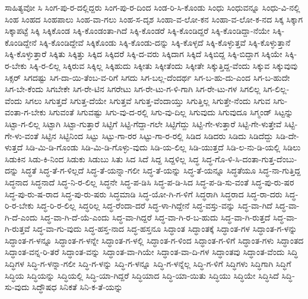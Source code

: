 {ಸಾಹಿತ್ಯವೋ
ಸಿ
ಸಿಂಗ-ಪು-ರ-ದಲ್ಲಿದ್ದರು
ಸಿಂಗ-ಪು-ರ-ದಿಂದ
ಸಿಂಡ-ರಿ-ಸಿ-ಕೊಂಡು
ಸಿಂಧು
ಸಿಂಧುವನ್ನೂ
ಸಿಂಧು-ವಿ-ನಲ್ಲಿ
ಸಿಂಹ
ಸಿಂಹದ
ಸಿಂಹಪಾಲು
ಸಿಂಹ-ವಾ-ಗಲು
ಸಿಂಹ-ಸ-ದೃಶ
ಸಿಂಹಾ-ವ-ಲೋ-ಕನ
ಸಿಂಹಾ-ವ-ಲೋ-ಕ-ನದ
ಸಿಕ್ಕ
ಸಿಕ್ಕಾಗ
ಸಿಕ್ಕಾಪಟ್ಟೆ
ಸಿಕ್ಕಿ
ಸಿಕ್ಕಿಕೊಂಡ
ಸಿಕ್ಕಿ-ಕೊಂಡಂತಾ-ಗಿದೆ
ಸಿಕ್ಕಿ-ಕೊಂಡರೆ
ಸಿಕ್ಕಿ-ಕೊಂಡಿದ್ದರೆ
ಸಿಕ್ಕಿ-ಕೊಂಡಿದ್ದಾ-ನೆಯೇ
ಸಿಕ್ಕಿ-ಕೊಂಡಿದ್ದೇನೆ
ಸಿಕ್ಕಿ-ಕೊಂಡಿದ್ದೇವೆ
ಸಿಕ್ಕಿಕೊಂಡು
ಸಿಕ್ಕಿ-ಕೊಂಡು-ದನ್ನು
ಸಿಕ್ಕಿ-ಕೊಳ್ಳದೆ
ಸಿಕ್ಕಿ-ಕೊಳ್ಳುತ್ತವೆ
ಸಿಕ್ಕಿ-ಕೊಳ್ಳುತ್ತಾನೆ
ಸಿಕ್ಕಿ-ಕೊಳ್ಳುತ್ತಾರೆ
ಸಿಕ್ಕಿತು
ಸಿಕ್ಕಿತ್ತು
ಸಿಕ್ಕಿದ
ಸಿಕ್ಕಿದರೆ
ಸಿಕ್ಕಿ-ದ-ವರು
ಸಿಕ್ಕಿದಾಗ
ಸಿಕ್ಕಿದೆ
ಸಿಕ್ಕಿಬಿದ್ದ
ಸಿಕ್ಕಿ-ಬಿದ್ದಾಗ
ಸಿಕ್ಕಿಯೇ
ಸಿಕ್ಕಿ-ರ-ಬೇಕು
ಸಿಕ್ಕಿ-ರ-ಲಿಲ್ಲ
ಸಿಕ್ಕಿರುವ
ಸಿಕ್ಕಿಲ್ಲ
ಸಿಕ್ಕಿಹುದು
ಸಿಕ್ಕೀತು
ಸಿಕ್ಕೀತೆಂದು
ಸಿಕ್ಕೀತೇ
ಸಿಕ್ಕುತ್ತಿದ್ದ-ವೆಂದು
ಸಿಕ್ಕುವ
ಸಿಕ್ಕುವುವು
ಸಿಕ್ಸರ್
ಸಿಗದಷ್ಟು
ಸಿಗ-ದಾ-ಯಿ-ತೆಂಬ-ವ-ರಿಗೆ
ಸಿಗದು
ಸಿಗ-ಬಲ್ಲ-ದೆಂದರ್ಥ
ಸಿಗ-ಬ-ಹು-ದು-ಎಂದ
ಸಿಗ-ಬ-ಹುದೇ
ಸಿಗ-ಬೇ-ಕೆಂದು
ಸಿಗಬೇಕೇ
ಸಿಗ-ರೇ-ಟಿನ
ಸಿಗರೇಟು
ಸಿಗ-ರೇ-ಟು-ಗ-ಳಿ-ಗಾಗಿ
ಸಿಗ-ರೇ-ಟು-ಗಳ
ಸಿಗಲಿಲ್ಲ
ಸಿಗ-ಲಿಲ್ಲ-ವೆಂದು
ಸಿಗಲು
ಸಿಗುತ್ತದೆ
ಸಿಗುತ್ತ-ದೆಯೇ
ಸಿಗುತ್ತವೆ
ಸಿಗುತ್ತ-ವೆಂದಾಯ್ತು
ಸಿಗುತ್ತಿಲ್ಲ
ಸಿಗುತ್ತೇ-ನೆಂದು
ಸಿಗುವ
ಸಿಗು-ವಂತಾ-ಗ-ಬೇಕು
ಸಿಗುವಂತೆ
ಸಿಗುವಷ್ಟು
ಸಿಗು-ವು-ದ-ರಲ್ಲಿ
ಸಿಗು-ವು-ದಿಲ್ಲ
ಸಿಗುವುದು
ಸಿಗುವುದೂ
ಸಿಗ್ಮಂಡ್
ಸಿಟ್ಟನ್ನು
ಸಿಟ್ಟಾ-ಗ-ಲಿಲ್ಲ
ಸಿಟ್ಟಾಗಿ
ಸಿಟ್ಟಾ-ಗುತ್ತಾರೆ
ಸಿಟ್ಟಿಗೆ
ಸಿಟ್ಟಿ-ಗೆದ್ದಾ-ಗಲೇ
ಸಿಟ್ಟಿಗೆದ್ದು
ಸಿಟ್ಟಿ-ಗೇ-ಳುತ್ತಾರೆ
ಸಿಟ್ಟಿ-ಗೇ-ಳುತ್ತೇವೆ
ಸಿಟ್ಟಿ-ಗೇ-ಳು-ವಂತೆ
ಸಿಟ್ಟಿನ
ಸಿಟ್ಟಿನಿಂದ
ಸಿಟ್ಟು
ಸಿಟ್ಟು-ಗಾ-ರರ
ಸಿಟ್ಟು-ಗಾ-ರ-ರಲ್ಲಿ
ಸಿಡಿದ
ಸಿಡಿದರು
ಸಿಡಿದು
ಸಿಡಿದೆದ್ದು
ಸಿಡಿ-ದೇ-ಳುತ್ತದೆ
ಸಿಡಿ-ಮಿ-ಡಿ-ಗೊಂಡು
ಸಿಡಿ-ಮಿ-ಡಿ-ಗೊಳ್ಳು-ವುದು
ಸಿಡಿ-ಯ-ಲಿಲ್ಲ
ಸಿಡಿ-ಯುತ್ತದೆ
ಸಿಡಿ-ಲ-ನು-ಡಿ-ಯಲ್ಲಿ
ಸಿಡಿಲು
ಸಿಡುಕಿನ
ಸಿಡು-ಕಿ-ನಿಂದ
ಸಿಡುಕು
ಸಿಡುಬು
ಸಿತು
ಸಿದ
ಸಿದೆ
ಸಿದ್ದ
ಸಿದ್ದಳಿಲ್ಲ
ಸಿದ್ಧ
ಸಿದ್ಧ-ಗೊ-ಳಿ-ಸಿ-ದಂತಾ-ಗುತ್ತ-ದೆಂಬು-ದನ್ನು
ಸಿದ್ಧತೆ
ಸಿದ್ಧ-ತೆ-ಗ-ಳಿಲ್ಲದೆ
ಸಿದ್ಧ-ತೆ-ಯನ್ನಾ-ಗಲೀ
ಸಿದ್ಧ-ತೆ-ಯನ್ನು
ಸಿದ್ಧ-ತೆ-ಯನ್ನೂ
ಸಿದ್ಧತೆಯೂ
ಸಿದ್ಧ-ನಾ-ಗುತ್ತಿದ್ದ
ಸಿದ್ಧನಾದ
ಸಿದ್ಧನಾದೆ
ಸಿದ್ಧ-ನಿ-ರ-ಲಿಲ್ಲ
ಸಿದ್ಧನೇ
ಸಿದ್ಧ-ಪ-ಡಿಸಿ
ಸಿದ್ಧ-ಪ-ಡಿ-ಸಿದ
ಸಿದ್ಧ-ಪ-ಡಿ-ಸು-ವಂತೆ
ಸಿದ್ಧ-ಪು-ರು-ಷರ
ಸಿದ್ಧ-ಪು-ರು-ಷ-ರಾದ
ಸಿದ್ಧ-ಪು-ರು-ಷರು
ಸಿದ್ಧಮಾಡಿ
ಸಿದ್ಧ-ಯೋ-ಗಿ-ಗ-ಳಿಗೆ
ಸಿದ್ಧರಾಗಿ
ಸಿದ್ಧರಾದ
ಸಿದ್ಧ-ರಾ-ದರು
ಸಿದ್ಧ-ರಿ-ರ-ಬೇಕು
ಸಿದ್ಧ-ರಿ-ರ-ಲಿಲ್ಲ
ಸಿದ್ಧರಿಲ್ಲ
ಸಿದ್ಧ-ರೆಂದಾ-ದರೆ
ಸಿದ್ಧ-ಳಾ-ಗಿದ್ದೇನೆ
ಸಿದ್ಧ-ವಸ್ತು-ವನ್ನು
ಸಿದ್ಧ-ವಾ-ಗಿದೆ
ಸಿದ್ಧ-ವಾ-ಗಿ-ದೆ-ಎಂದು
ಸಿದ್ಧ-ವಾ-ಗಿ-ದೆ-ಯೆ-ಎಂದು
ಸಿದ್ಧ-ವಾ-ಗಿದ್ದರೆ
ಸಿದ್ಧ-ವಾ-ಗಿ-ರ-ಬ-ಹುದು
ಸಿದ್ಧ-ವಾ-ಗಿ-ರುತ್ತದೆ
ಸಿದ್ಧ-ವಾ-ಗಿ-ರುತ್ತವೆ
ಸಿದ್ಧ-ವಾ-ಗು-ವುದು
ಸಿದ್ಧ-ಹಸ್ತ-ನಾದ
ಸಿದ್ಧ-ಹಸ್ತನೂ
ಸಿದ್ಧಾಂತ
ಸಿದ್ಧಾಂತಕ್ಕೆ
ಸಿದ್ಧಾಂತ-ಗಳ
ಸಿದ್ಧಾಂತ-ಗ-ಳನ್ನು
ಸಿದ್ಧಾಂತ-ಗ-ಳನ್ನೂ
ಸಿದ್ಧಾಂತ-ಗ-ಳನ್ನೇ
ಸಿದ್ಧಾಂತ-ಗ-ಳಲ್ಲಿ
ಸಿದ್ಧಾಂತ-ಗ-ಳಿಂದ
ಸಿದ್ಧಾಂತ-ಗ-ಳಿಗೆ
ಸಿದ್ಧಾಂತ-ಗಳು
ಸಿದ್ಧಾಂತದ
ಸಿದ್ಧಾಂತ-ವನ್ನ-ರಿ-ತರೆ
ಸಿದ್ಧಾಂತ-ವನ್ನು
ಸಿದ್ಧಾಂತ-ವಾ-ಗಿಯೇ
ಸಿದ್ಧಾಂತ-ವಾ-ದಿ-ಗಳ
ಸಿದ್ಧಾಂತವು
ಸಿದ್ಧಾಂತ-ವೆಂದು
ಸಿದ್ಧಿ
ಸಿದ್ಧಿಗಳ
ಸಿದ್ಧಿ-ಗ-ಳನ್ನಾ-ಗಲೀ
ಸಿದ್ಧಿ-ಗ-ಳನ್ನು
ಸಿದ್ಧಿ-ಗ-ಳನ್ನೂ
ಸಿದ್ಧಿ-ಗ-ಳನ್ನೆಲ್ಲ
ಸಿದ್ಧಿ-ಗ-ಳಿಗೆ
ಸಿದ್ಧಿಗಳು
ಸಿದ್ಧಿಗಾಗಿ
ಸಿದ್ಧಿಗೆ
ಸಿದ್ಧಿಯ
ಸಿದ್ಧಿಯನ್ನು
ಸಿದ್ಧಿಯಲ್ಲಿ
ಸಿದ್ಧಿ-ಯಾ-ಗಿದ್ದರೆ
ಸಿದ್ಧಿಯಾದ
ಸಿದ್ಧಿ-ಯಾ-ಯಿತು
ಸಿದ್ಧಿಯು
ಸಿದ್ಧಿಯೇ
ಸಿದ್ಧಿಸಿದೆ
ಸಿದ್ಧಿ-ಸು-ವುದು
ಸಿದ್ಧೌಷಧ
ಸಿನಿಕತೆ
ಸಿನಿ-ಕ-ತೆ-ಯನ್ನು
}
